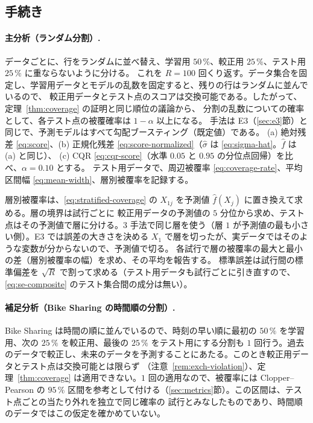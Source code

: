 \documentclass[a4paper,11pt]{jsarticle}
\theoremstyle{definition}
\theoremstyle{plain}
\theoremstyle{remark}
\newcommand{\fhat}{\hat{f}}
\begin{document}
\subsection{手続き}
\label{sec:real-data-procedure}
\paragraph{主分析（ランダム分割）.}
データごとに、行をランダムに並べ替え、学習用 $50\,\%$、較正用 $25\,\%$、テスト用 $25\,\%$ に重ならないように分ける。
これを $R=100$ 回くり返す。データ集合を固定し、学習用データとモデルの乱数を固定すると、残りの行はランダムに並んでいるので、
較正用データとテスト点のスコアは交換可能である。したがって、定理~\ref{thm:coverage} の証明と同じ順位の議論から、
分割の乱数についての確率として、各テスト点の被覆確率は $1-\alpha$ 以上になる。
手法は E3（\ref{sec:e3}節）と同じで、予測モデルはすべて勾配ブースティング（既定値）である。
(a) 絶対残差 \eqref{eq:score}、(b) 正規化残差 \eqref{eq:score-normalized}（$\hat\sigma$ は \eqref{eq:sigma-hat}。$\fhat$ は (a) と同じ）、
(c) CQR \eqref{eq:cqr-score}（水準 $0.05$ と $0.95$ の分位点回帰）を比べ、$\alpha=0.10$ とする。
テスト用データで、周辺被覆率 \eqref{eq:coverage-rate}、平均区間幅 \eqref{eq:mean-width}、層別被覆率を記録する。

層別被覆率は、\eqref{eq:stratified-coverage} の $X_{1j}$ を予測値 $\fhat(X_j)$ に置き換えて求める。層の境界は試行ごとに
較正用データの予測値の $5$ 分位から求め、テスト点はその予測値で層に分ける。$3$ 手法で同じ層を使う（層 $1$ が予測値の最も小さい側）。E3 では誤差の大きさを決める $X_1$ で層を切ったが、実データではそのような変数が分からないので、予測値で切る。
各試行で層の被覆率の最大と最小の差（層別被覆率の幅）を求め、その平均を報告する。
標準誤差は試行間の標準偏差を $\sqrt{R}$ で割って求める（テスト用データも試行ごとに引き直すので、\eqref{eq:se-composite} のテスト集合間の成分は無い）。

\paragraph{補足分析（Bike Sharing の時間順の分割）.}
Bike Sharing は時間の順に並んでいるので、時刻の早い順に最初の $50\,\%$ を学習用、次の $25\,\%$ を較正用、最後の $25\,\%$ をテスト用にする分割も
$1$ 回行う。過去のデータで較正し、未来のデータを予測することにあたる。このとき較正用データとテスト点は交換可能とは限らず
（注意~\ref{rem:exch-violation}）、定理~\ref{thm:coverage} は適用できない。$1$ 回の適用なので、被覆率には
Clopper--Pearson の $95\,\%$ 区間を参考として付ける（\ref{sec:metrics}節）。この区間は、テスト点ごとの当たり外れを独立で同じ確率の
試行とみなしたものであり、時間順のデータではこの仮定を確かめていない。
\end{document}

